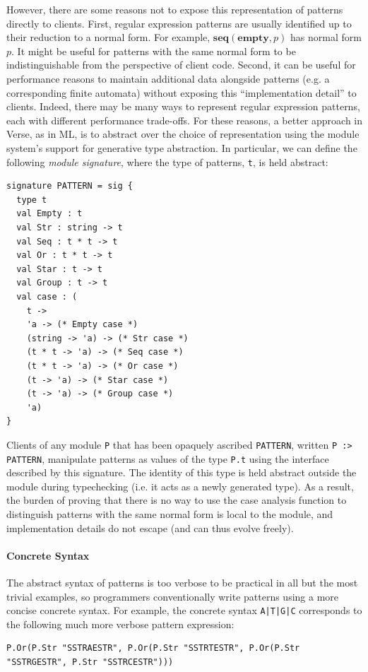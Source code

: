 However, there are some reasons not to expose this representation of patterns directly to clients. First, regular expression patterns are usually identified up to their reduction to a normal form. For example, $\textbf{seq}(\textbf{empty}, p)$ has normal form $p$. It might be useful for patterns with the same normal form to be  indistinguishable from the perspective of client code. Second, it can be useful for performance reasons to maintain additional data alongside patterns (e.g. a corresponding finite automata) without exposing this ``implementation detail'' to clients. Indeed, there may be many ways to represent regular expression patterns, each with different performance trade-offs. For these reasons, a better approach in Verse, as in ML, is to abstract over the choice of representation using  the module system's support for generative type abstraction. In particular, we can define the following \emph{module signature}, where the type of patterns, \lstinline{t}, is held abstract:

\begin{lstlisting}[deletekeywords={case},numbers=none]
signature PATTERN = sig {
  type t
  val Empty : t
  val Str : string -> t
  val Seq : t * t -> t
  val Or : t * t -> t
  val Star : t -> t
  val Group : t -> t
  val case : (
    t -> 
    'a -> (* Empty case *)
    (string -> 'a) -> (* Str case *)
    (t * t -> 'a) -> (* Seq case *)
    (t * t -> 'a) -> (* Or case *)
    (t -> 'a) -> (* Star case *)
    (t -> 'a) -> (* Group case *)
    'a)
}
\end{lstlisting}
 Clients of any module \lstinline{P} that has been opaquely ascribed \lstinline{PATTERN}, written \lstinline{P :> PATTERN}, manipulate patterns as values of the type \verb|P.t| using the interface described by this signature. The identity of this type is held abstract outside the module during typechecking (i.e. it acts as a newly generated type). As a result, the burden of proving that there is no way to use the case analysis function to distinguish patterns with the same normal form is local to the module, and implementation details do not escape (and can thus evolve freely). %

\paragraph{Concrete Syntax} The abstract syntax of patterns is too verbose to be practical  in all but the most trivial examples, so programmers conventionally write patterns using a more concise concrete syntax. For example, the concrete syntax \lstinline{A|T|G|C} corresponds to the following much more verbose pattern expression:
\begin{lstlisting}[numbers=none,mathescape=|]
P.Or(P.Str "SSTRAESTR", P.Or(P.Str "SSTRTESTR", P.Or(P.Str "SSTRGESTR", P.Str "SSTRCESTR")))
\end{lstlisting} 



